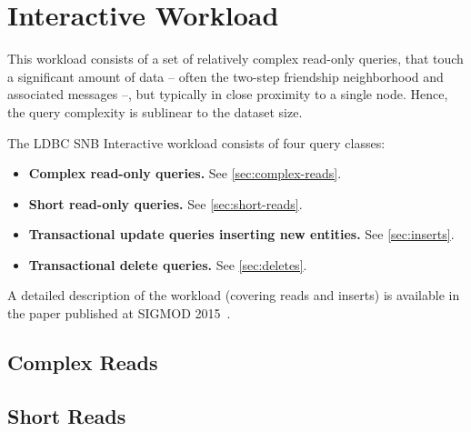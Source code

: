 \chapter{Interactive Workload}
\label{section:interactive}

This workload consists of a set of relatively complex read-only queries, that touch a significant
amount of data -- often the two-step friendship neighborhood and associated messages --, but typically in close proximity to a single node. Hence, the query complexity is sublinear to the dataset size.

The LDBC SNB Interactive workload consists of four query classes:

\begin{itemize}
\item \textbf{Complex read-only queries.} See \autoref{sec:complex-reads}.
\item \textbf{Short read-only queries.} See \autoref{sec:short-reads}.
\item \textbf{Transactional update queries inserting new entities.} See \autoref{sec:inserts}.
\item \textbf{Transactional delete queries.} See \autoref{sec:deletes}.
\end{itemize}

A detailed description of the workload (covering reads and inserts) is available in the paper published at \mbox{SIGMOD} 2015~\cite{DBLP:conf/sigmod/ErlingALCGPPB15}.


\section{Complex Reads}
\label{sec:complex-reads}




\section{Short Reads}
\label{sec:short-reads}

